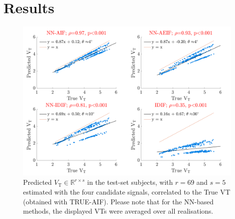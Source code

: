     \section{Results} \label{sec:a_bayesian_neural_network-based_method_for_the_extraction_of_a_metabolite_corrected_arterial_input_function_from_dynamic_pbr28_pet_appendix_results}
        \begin{figure}
            \centering
            
            \includegraphics[width=1.0\linewidth]{figures/arterial_input_function_correlation.png}
            
            \captionsetup{singlelinecheck=false}
            \caption{
                Predicted $V_{\mathrm{T}} \in \mathbb{R}^{r \times s}$ in the test-set subjects, with $r = 69$ and $s=5$ estimated with the four candidate signals, correlated to the True \gls{VT} (obtained with TRUE-\gls{AIF}). Please note that for the \gls{NN}-based methods, the displayed \glspl{VT} were averaged over all realisations.
            }
            \label{fig:a_bayesian_neural_network-based_method_for_the_extraction_of_a_metabolite_corrected_arterial_input_function_from_dynamic_pbr28_pet_appendix_results_correlation}
        \end{figure}
    
